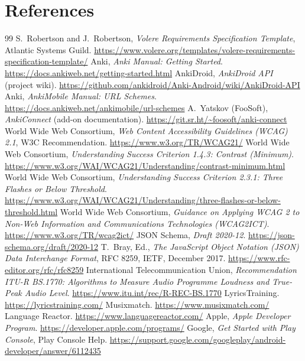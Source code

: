 \documentclass[12pt]{article}
\begin{document}
\section*{References}

\begingroup
\renewcommand{\section}[2]{}
\begin{thebibliography}{99}
 S.~Robertson and J.~Robertson, \emph{Volere Requirements
  Specification Template}, Atlantic Systems Guild.
  \url{https://www.volere.org/templates/volere-requirements-specification-template/}
 Anki, \emph{Anki Manual: Getting Started}.
  \url{https://docs.ankiweb.net/getting-started.html}
 AnkiDroid, \emph{AnkiDroid API} (project wiki).
  \url{https://github.com/ankidroid/Anki-Android/wiki/AnkiDroid-API}
 Anki, \emph{AnkiMobile Manual: URL Schemes}.
  \url{https://docs.ankiweb.net/ankimobile/url-schemes}
 A.~Yatskov (FooSoft), \emph{AnkiConnect} (add-on
  documentation). \url{https://git.sr.ht/~foosoft/anki-connect}
 World Wide Web Consortium, \emph{Web Content Accessibility
  Guidelines (WCAG) 2.1}, W3C Recommendation.
  \url{https://www.w3.org/TR/WCAG21/}
 World Wide Web Consortium, \emph{Understanding Success
  Criterion 1.4.3: Contrast (Minimum)}.
  \url{https://www.w3.org/WAI/WCAG21/Understanding/contrast-minimum.html}
 World Wide Web Consortium, \emph{Understanding Success
  Criterion 2.3.1: Three Flashes or Below Threshold}.
  \url{https://www.w3.org/WAI/WCAG21/Understanding/three-flashes-or-below-threshold.html}
 World Wide Web Consortium, \emph{Guidance on Applying WCAG
  2 to Non-Web Information and Communications Technologies (WCAG2ICT)}.
  \url{https://www.w3.org/TR/wcag2ict/}
 JSON Schema, \emph{Draft 2020-12}.
  \url{https://json-schema.org/draft/2020-12}
 T.~Bray, Ed., \emph{The JavaScript Object Notation (JSON)
  Data Interchange Format}, RFC 8259, IETF, December 2017.
  \url{https://www.rfc-editor.org/rfc/rfc8259}
 International Telecommunication Union, \emph{Recommendation
  ITU-R BS.1770: Algorithms to Measure Audio Programme Loudness and True-Peak
  Audio Level}. \url{https://www.itu.int/rec/R-REC-BS.1770}
 LyricsTraining. \url{https://lyricstraining.com/}
 Musixmatch. \url{https://www.musixmatch.com/}
 Language Reactor.
  \url{https://www.languagereactor.com/}
 Apple, \emph{Apple Developer Program}.
  \url{https://developer.apple.com/programs/}
 Google, \emph{Get Started with Play Console}, Play Console
  Help. \url{https://support.google.com/googleplay/android-developer/answer/6112435}
\end{thebibliography}
\endgroup
\end{document}
